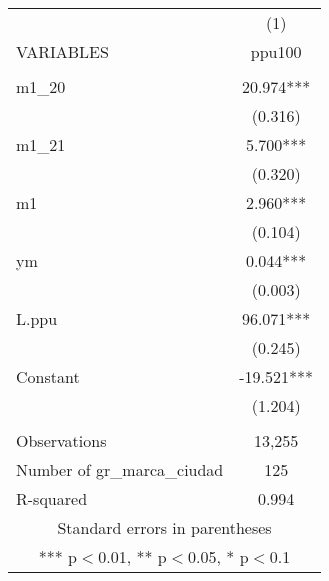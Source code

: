 \begin{tabular}{lc} \hline
 & (1) \\
VARIABLES & ppu100 \\ \hline
 &  \\
m1\_20 & 20.974*** \\
 & (0.316) \\
m1\_21 & 5.700*** \\
 & (0.320) \\
m1 & 2.960*** \\
 & (0.104) \\
ym & 0.044*** \\
 & (0.003) \\
L.ppu & 96.071*** \\
 & (0.245) \\
Constant & -19.521*** \\
 & (1.204) \\
 &  \\
Observations & 13,255 \\
Number of gr\_marca\_ciudad & 125 \\
 R-squared & 0.994 \\ \hline
\multicolumn{2}{c}{ Standard errors in parentheses} \\
\multicolumn{2}{c}{ *** p$<$0.01, ** p$<$0.05, * p$<$0.1} \\
\end{tabular}
